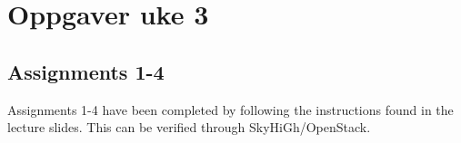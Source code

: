\section{Oppgaver uke 3}
\subsection{Assignments 1-4} 
Assignments 1-4 have been completed by following the instructions found in the lecture slides. This can be verified through SkyHiGh/OpenStack.